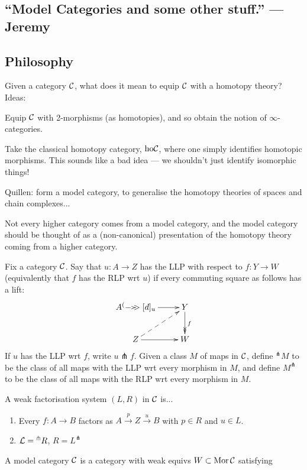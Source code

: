 \documentclass[11pt]{article}
\newcommand{\KanSemResponse}[1]
{
\thispagestyle{fancy}
\section{#1}
}
\begin{document}
\begin{JeremyModelPractice}
\KanSemResponse
{``Model Categories and some other stuff.'' --- Jeremy}
\subsection*{Philosophy}
Given a category $\mathcal{C}$, what does it mean to equip $\mathcal{C}$ with a homotopy theory? Ideas:

\begin{itemise}
\item Equip $\mathcal{C}$ with 2-morphisms (as homotopies), and so obtain the notion of $\infty$-categories.
\item Take the classical homotopy category, $\textup{ho}\mathcal{C}$, where one simply identifies homotopic morphisms. This sounds like a bad idea --- we shouldn't just identify isomorphic things!
\item Quillen: form a model category, to generalise the homotopy theories of spaces and chain complexes...
\end{itemise}
Not every higher category comes from a model category, and the model category should be thought of as a (non-canonical) presentation of the homotopy theory coming from a higher category.
\begin{defn*}
Fix a category $\mathcal{C}$. Say that $u:A\to Z$ has the LLP with respect to $f:Y\to W$ (equivalently that $f$ has the RLP wrt $u$) if every commuting square as follows has a lift:
\[\xymatrix{
A\ar[r]\xycofib[d]_u&Y\ar@{->>}[d]^f\\
Z\ar@{-->}[ru]\ar[r]&W
}\]
If $u$ has the LLP wrt $f$, write $u\pitchfork f$. Given a class $M$ of maps in $\mathcal{C}$, define $^\pitchfork M$ to be the class of all maps with the LLP wrt every morphism in $M$, and define $ M^\pitchfork$ to be the class of all maps with the RLP wrt every morphism in $M$.
\end{defn*}
\begin{defn*}
A weak factorisation system $(L,R)$ in $\mathcal{C}$ is...
\begin{enumerate}\squishlist
\item Every $f:A\to B$ factors as $A\overset{p}{\to} Z\overset{u}{\to} B$ with $p\in R$ and $u\in L$.
\item $\mathcal{L}={^\pitchfork R}$, $R=L^\pitchfork$
\end{enumerate}
\end{defn*}
\begin{defn*}
A model category $\mathcal{C}$ is a category with weak equivs $W\subset\operatorname{Mor}\mathcal{C}$ satisfying
\begin{enumerate}\squishlist

\end{enumerate}
\end{defn*}
\end{JeremyModelPractice}
\end{document}

